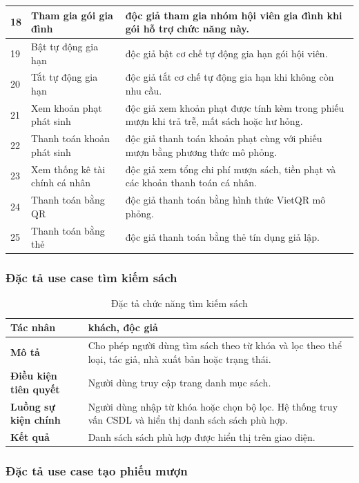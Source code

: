 \documentclass[../main.tex]{subfiles}
\begin{document}
\begin{longtable}{|p{1cm}|p{4cm}|p{8cm}|}
\hline
18 & Tham gia gói gia đình & độc giả tham gia nhóm hội viên gia đình khi gói hỗ trợ chức năng này. \\
\hline
19 & Bật tự động gia hạn & độc giả bật cơ chế tự động gia hạn gói hội viên. \\
\hline
20 & Tắt tự động gia hạn & độc giả tắt cơ chế tự động gia hạn khi không còn nhu cầu. \\
\hline
21 & Xem khoản phạt phát sinh & độc giả xem khoản phạt được tính kèm trong phiếu mượn khi trả trễ, mất sách hoặc hư hỏng. \\
\hline
22 & Thanh toán khoản phát sinh & độc giả thanh toán khoản phạt cùng với phiếu mượn bằng phương thức mô phỏng. \\
\hline
23 & Xem thống kê tài chính cá nhân & độc giả xem tổng chi phí mượn sách, tiền phạt và các khoản thanh toán cá nhân. \\
\hline
24 & Thanh toán bằng QR & độc giả thanh toán bằng hình thức VietQR mô phỏng. \\
\hline
25 & Thanh toán bằng thẻ & độc giả thanh toán bằng thẻ tín dụng giả lập. \\
\hline
\end{longtable}

\subsubsection{Đặc tả use case tìm kiếm sách}

\begin{table}[H]
\centering
\caption{Đặc tả chức năng tìm kiếm sách}
\begin{tabularx}{\textwidth}{|p{4cm}|X|}
\hline
\textbf{Tác nhân} & khách, độc giả \\
\hline
\textbf{Mô tả} & Cho phép người dùng tìm sách theo từ khóa và lọc theo thể loại, tác giả, nhà xuất bản hoặc trạng thái. \\
\hline
\textbf{Điều kiện tiên quyết} & Người dùng truy cập trang danh mục sách. \\
\hline
\textbf{Luồng sự kiện chính} & Người dùng nhập từ khóa hoặc chọn bộ lọc. Hệ thống truy vấn CSDL và hiển thị danh sách sách phù hợp. \\
\hline
\textbf{Kết quả} & Danh sách sách phù hợp được hiển thị trên giao diện. \\
\hline
\end{tabularx}
\end{table}

\subsubsection{Đặc tả use case tạo phiếu mượn}
\end{document}

